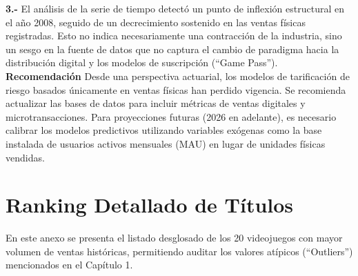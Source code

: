 \documentclass[oneside,11pt]{Latex/Classes/PhDthesisPSnPDF}
\begin{document}
\textbf{3.-} El análisis de la serie de tiempo detectó un punto de
inflexión estructural en el año 2008, seguido de un decrecimiento
sostenido en las ventas físicas registradas. Esto no indica
necesariamente una contracción de la industria, sino un sesgo en la
fuente de datos que no captura el cambio de paradigma hacia la
distribución digital y los modelos de suscripción (``Game Pass'').\\

\textbf{Recomendación} Desde una perspectiva actuarial, los modelos de
tarificación de riesgo basados únicamente en ventas físicas han perdido
vigencia. Se recomienda actualizar las bases de datos para incluir
métricas de ventas digitales y microtransacciones. Para proyecciones
futuras (2026 en adelante), es necesario calibrar los modelos
predictivos utilizando variables exógenas como la base instalada de
usuarios activos mensuales (MAU) en lugar de unidades físicas vendidas.

\appendix
\renewcommand{\thechapter}{\Alph{chapter}}

\chapter{Ranking Detallado de Títulos}

En este anexo se presenta el listado desglosado de los 20 videojuegos
con mayor volumen de ventas históricas, permitiendo auditar los valores
atípicos (``Outliers'') mencionados en el Capítulo 1.
\end{document}
